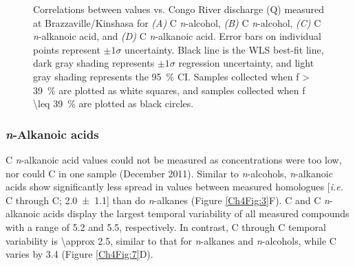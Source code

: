\begin{figure}[p]
	\caption[Correlations between  and discharge]{Correlations between  values vs. Congo River discharge (Q) measured at Brazzaville/Kinshasa for \textit{(A)} C \textit{n}-alcohol, \textit{(B)} C \textit{n}-alcohol, \textit{(C)} C \textit{n}-alkanoic acid, and \textit{(D)} C \textit{n}-alkanoic acid. Error bars on individual points represent $\pm 1 \sigma$ uncertainty. Black line is the WLS best-fit line, dark gray shading represents $\pm 1 \sigma$ regression uncertainty, and light gray shading represents the \SI{95}{\%} CI. Samples collected when f \SI{> 39}{\%} are plotted as white squares, and samples collected when f \SI{\leq  39}{\%} are plotted as black circles.}
	\label{Ch4Fig:8} 
\end{figure}

\subsubsection{\textit{n}-Alkanoic acids}

C \textit{n}-alkanoic acid  values could not be measured as concentrations were too low, nor could C in one sample (December 2011). Similar to \textit{n}-alcohols, \textit{n}-alkanoic acids show significantly less spread in  values between measured homologues [\textit{i.e.} C through C; \SI{2.0 \pm 1.1}{\permil}] than do \textit{n}-alkanes (Figure \ref{Ch4Fig:3}F). C and C \textit{n}-alkanoic acids display the largest temporal variability of all measured compounds with a range of \SI{5.2}{\permil} and \SI{5.5}{\permil}, respectively. In contrast, C through C temporal variability is \SI{\approx 2.5}{\permil}, similar to that for \textit{n}-alkanes and \textit{n}-alcohols, while C varies by \SI{3.4}{\permil} (Figure \ref{Ch4Fig:7}D).

